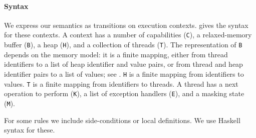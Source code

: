 \paragraph{Syntax}
We express our semantics as transitions on execution contexts.
 gives the syntax for these contexts.  A context
has a number of capabilities (\texttt{C}), a relaxed-memory buffer
(\texttt{B}), a heap (\texttt{H}), and a collection of threads
(\texttt{T}).  The representation of \texttt{B} depends on the memory
model: it is a finite mapping, either from thread identifiers to a
list of heap identifier and value pairs, or from thread and heap
identifier pairs to a list of values; see
.  \texttt{H} is a finite mapping
from identifiers to values.  \texttt{T} is a finite mapping from
identifiers to threads.  A thread has a next operation to perform
(\texttt{K}), a list of exception handlers (\texttt{E}), and a masking
state (\texttt{M}).

For some rules we include side-conditions or local definitions.  We
use Haskell syntax for these.

